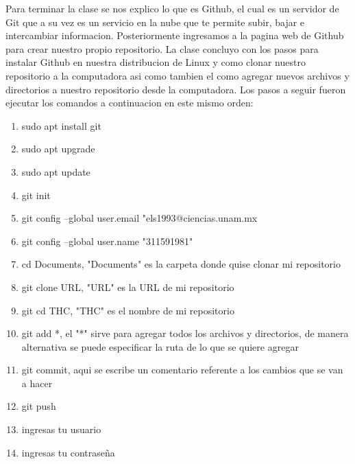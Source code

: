 \documentclass[letterpaper, 12pt, oneside]{article}
\begin{document}
	Para terminar la clase se nos explico lo que es Github, el cual es un servidor de Git que a su vez es un servicio en la nube que te permite subir, bajar e intercambiar informacion. Posteriormente ingresamos a la pagina web de Github para crear nuestro propio repositorio. La clase concluyo con los pasos para instalar Github en nuestra distribucion de Linux y como clonar nuestro repositorio a la computadora asi como tambien el como agregar nuevos archivos y directorios a nuestro repositorio desde la computadora. Los pasos a seguir fueron ejecutar los comandos a continuacion en este mismo orden:
	\begin{enumerate}
		\item sudo apt install git
		\item sudo apt upgrade
		\item sudo apt update
		\item git init
		\item git config --global user.email "els1993@ciencias.unam.mx
		\item git config --global user.name "311591981"
		\item cd Documents, "Documents" es la carpeta donde quise clonar mi repositorio
		\item git clone URL, "URL" es la URL de mi repositorio
		\item git cd THC, "THC" es el nombre de mi repositorio
		\item git add *, el "*" sirve para agregar todos los archivos y directorios, de manera alternativa se puede especificar la ruta de lo que se quiere agregar
		\item git commit, aqui se escribe un comentario referente a los cambios que se van a hacer
		\item git push
		\item ingresas tu usuario
		\item ingresas tu contraseña
	\end{enumerate}
\end{document}
